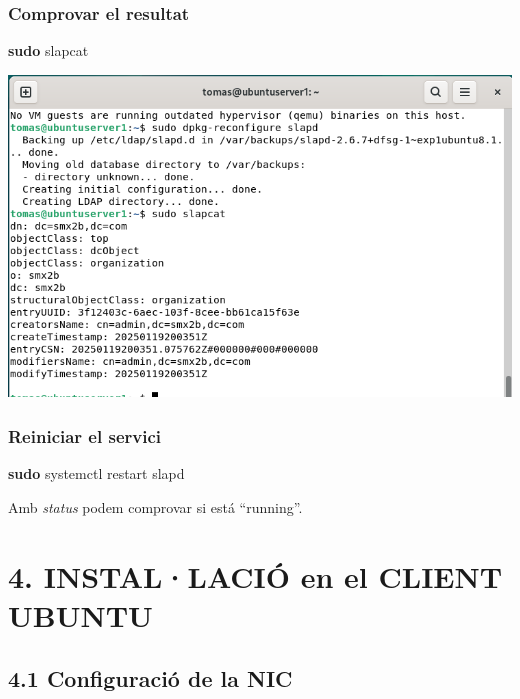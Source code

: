\documentclass[
  12 pt,
  a4paper,
]{article}
\newenvironment{Shaded}{\begin{snugshade}}{\end{snugshade}}
\newcommand{\FunctionTok}[1]{\textcolor[rgb]{0.13,0.29,0.53}{\textbf{#1}}}
\newcommand{\NormalTok}[1]{#1}
\begin{document}
\subsubsection{Comprovar el resultat}\label{comprovar-el-resultat}

\begin{Shaded}
\begin{Highlighting}[]
\FunctionTok{sudo}\NormalTok{ slapcat}
\end{Highlighting}
\end{Shaded}

\includegraphics{png/slapd4.png}

\subsubsection{Reiniciar el servici}\label{reiniciar-el-servici}

\begin{Shaded}
\begin{Highlighting}[]
\FunctionTok{sudo}\NormalTok{ systemctl restart slapd}
\end{Highlighting}
\end{Shaded}

Amb \emph{status} podem comprovar si está ``running''.

\section{4. INSTAL·LACIÓ en el CLIENT
UBUNTU}\label{installaciuxf3-en-el-client-ubuntu}

\subsection{4.1 Configuració de la NIC}\label{configuraciuxf3-de-la-nic}
\end{document}
